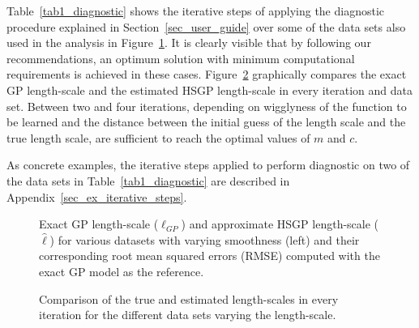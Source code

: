 Table~\ref{tab1_diagnostic} shows the iterative steps of applying the diagnostic procedure explained in Section~\ref{sec_user_guide} over some of the data sets also used in the analysis in Figure~\ref{fig6_lscale_comparison}. It is clearly visible that by following our recommendations, an optimum solution with minimum computational requirements is achieved in these cases. Figure~\ref{fig7_diagnostic_lscale_comparison} graphically compares the exact GP length-scale and the estimated HSGP length-scale in every iteration and data set. Between two and four iterations, depending on wigglyness of the function to be learned and the distance between the initial guess of the length scale and the true length scale, are sufficient to reach the optimal values of $m$ and $c$. 

As concrete examples, the iterative steps applied to perform diagnostic on two of the data sets in Table~\ref{tab1_diagnostic} are described in Appendix~\ref{sec_ex_iterative_steps}.

\begin{figure}[t]
\centering
{}
\caption{Exact GP length-scale ($\ell_{GP}$) and approximate HSGP length-scale ($\hat{\ell}$) for various datasets with varying smoothness (left) and their corresponding root mean squared errors (RMSE) computed with the exact GP model as the reference.}
  \label{fig6_lscale_comparison}
\end{figure}

\begin{figure}
\centering
{}
\caption{Comparison of the true and estimated length-scales in every iteration for the different data sets varying the length-scale.}
  \label{fig7_diagnostic_lscale_comparison}
\end{figure}


